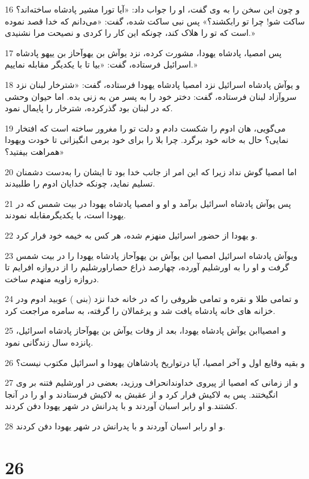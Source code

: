 \par 16 و چون این سخن را به وی گفت، او را جواب داد: «آیا تورا مشیر پادشاه ساخته‌اند؟ ساکت شو! چرا تو رابکشند؟» پس نبی ساکت شده، گفت: «می‌دانم که خدا قصد نموده است که تو را هلاک کند، چونکه این کار را کردی و نصیحت مرا نشنیدی.»
\par 17 پس امصیا، پادشاه یهودا، مشورت کرده، نزد یوآش بن یهوآحاز بن ییهو پادشاه اسرائیل فرستاده، گفت: «بیا تا با یکدیگر مقابله نماییم.»
\par 18 و یوآش پادشاه اسرائیل نزد امصیا پادشاه یهودا فرستاده، گفت: «شترخار لبنان نزد سروآزاد لبنان فرستاده، گفت: دختر خود را به پسر من به زنی بده. اما حیوان وحشی که در لبنان بود گذرکرده، شترخار را پایمال نمود.
\par 19 می‌گویی، هان ادوم را شکست دادم و دلت تو را مغرور ساخته است که افتخار نمایی؟ حال به خانه خود برگرد. چرا بلا را برای خود برمی انگیزانی تا خودت ویهودا همراهت بیفتید؟»
\par 20 اما امصیا گوش نداد زیرا که این امر از جانب خدا بود تا ایشان را به‌دست دشمنان تسلیم نماید، چونکه خدایان ادوم را طلبیدند.
\par 21 پس یوآش پادشاه اسرائیل برآمد و او و امصیا پادشاه یهودا در بیت شمس که در یهودا است، با یکدیگرمقابله نمودند.
\par 22 و یهودا از حضور اسرائیل منهزم شده، هر کس به خیمه خود فرار کرد.
\par 23 ویوآش پادشاه اسرائیل امصیا ابن یوآش بن یهوآحاز پادشاه یهودا را در بیت شمس گرفت و او را به اورشلیم آورده، چهارصد ذراع حصاراورشلیم را از دروازه افرایم تا دروازه زاویه منهدم ساخت.
\par 24 و تمامی طلا و نقره و تمامی ظروفی را که در خانه خدا نزد (بنی ) عوبید ادوم ودر خزانه های خانه پادشاه یافت شد و یرغمالان را گرفته، به سامره مراجعت کرد.
\par 25 و امصیاابن یوآش پادشاه یهودا، بعد از وفات یوآش بن یهوآحاز پادشاه اسرائیل، پانزده سال زندگانی نمود.
\par 26 و بقیه وقایع اول و آخر امصیا، آیا درتواریخ پادشاهان یهودا و اسرائیل مکتوب نیست؟
\par 27 و از زمانی که امصیا از پیروی خداوندانحراف ورزید، بعضی در اورشلیم فتنه بر وی انگیختند. پس به لاکیش فرار کرد و از عقبش به لاکیش فرستادند و او را در آنجا کشتند.و او رابر اسبان آوردند و با پدرانش در شهر یهودا دفن کردند.
\par 28 و او رابر اسبان آوردند و با پدرانش در شهر یهودا دفن کردند.
 
\chapter{26}

